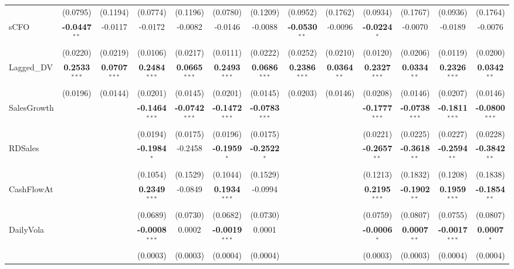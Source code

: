\documentclass[11pt,a4paper]{article}
\begin{document}
\begin{table}[htbp]
\begin{tabular}{lcccccccccccc}
 & (0.0795) & (0.1194) & (0.0774) & (0.1196) & (0.0780) & (0.1209) & (0.0952) & (0.1762) & (0.0934) & (0.1767) & (0.0936) & (0.1764) \\
sCFO & \textbf{-0.0447}$^{**}$ & -0.0117 & -0.0172 & -0.0082 & -0.0146 & -0.0088 & \textbf{-0.0530}$^{**}$ & -0.0096 & \textbf{-0.0224}$^{*}$ & -0.0070 & -0.0189 & -0.0076 \\
 & (0.0220) & (0.0219) & (0.0106) & (0.0217) & (0.0111) & (0.0222) & (0.0252) & (0.0210) & (0.0120) & (0.0206) & (0.0119) & (0.0200) \\
Lagged\_DV & \textbf{0.2533}$^{***}$ & \textbf{0.0707}$^{***}$ & \textbf{0.2484}$^{***}$ & \textbf{0.0665}$^{***}$ & \textbf{0.2493}$^{***}$ & \textbf{0.0686}$^{***}$ & \textbf{0.2386}$^{***}$ & \textbf{0.0364}$^{**}$ & \textbf{0.2327}$^{***}$ & \textbf{0.0334}$^{**}$ & \textbf{0.2326}$^{***}$ & \textbf{0.0342}$^{**}$ \\
 & (0.0196) & (0.0144) & (0.0201) & (0.0145) & (0.0201) & (0.0145) & (0.0203) & (0.0146) & (0.0208) & (0.0146) & (0.0207) & (0.0146) \\
SalesGrowth &  &  & \textbf{-0.1464}$^{***}$ & \textbf{-0.0742}$^{***}$ & \textbf{-0.1472}$^{***}$ & \textbf{-0.0783}$^{***}$ &  &  & \textbf{-0.1777}$^{***}$ & \textbf{-0.0738}$^{***}$ & \textbf{-0.1811}$^{***}$ & \textbf{-0.0800}$^{***}$ \\
 &  &  & (0.0194) & (0.0175) & (0.0196) & (0.0175) &  &  & (0.0221) & (0.0225) & (0.0227) & (0.0228) \\
RDSales &  &  & \textbf{-0.1984}$^{*}$ & -0.2458 & \textbf{-0.1959}$^{*}$ & \textbf{-0.2522}$^{*}$ &  &  & \textbf{-0.2657}$^{**}$ & \textbf{-0.3618}$^{**}$ & \textbf{-0.2594}$^{**}$ & \textbf{-0.3842}$^{**}$ \\
 &  &  & (0.1054) & (0.1529) & (0.1044) & (0.1529) &  &  & (0.1213) & (0.1832) & (0.1208) & (0.1838) \\
CashFlowAt &  &  & \textbf{0.2349}$^{***}$ & -0.0849 & \textbf{0.1934}$^{***}$ & -0.0994 &  &  & \textbf{0.2195}$^{***}$ & \textbf{-0.1902}$^{**}$ & \textbf{0.1959}$^{***}$ & \textbf{-0.1854}$^{**}$ \\
 &  &  & (0.0689) & (0.0730) & (0.0682) & (0.0730) &  &  & (0.0759) & (0.0807) & (0.0755) & (0.0807) \\
DailyVola &  &  & \textbf{-0.0008}$^{***}$ & 0.0002 & \textbf{-0.0019}$^{***}$ & 0.0001 &  &  & \textbf{-0.0006}$^{*}$ & \textbf{0.0007}$^{**}$ & \textbf{-0.0017}$^{***}$ & \textbf{0.0007}$^{*}$ \\
 &  &  & (0.0003) & (0.0003) & (0.0004) & (0.0004) &  &  & (0.0003) & (0.0003) & (0.0004) & (0.0004) \\

\end{tabular}
\end{table}
\end{document}
